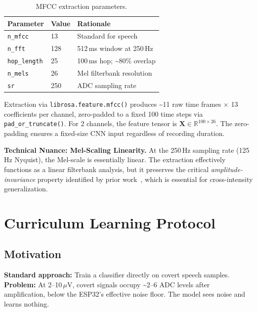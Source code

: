 \documentclass{article}
\begin{document}
\begin{table}[h]
\centering
\caption{MFCC extraction parameters.}
\label{tab:mfcc}
\begin{tabular}{@{}lll@{}}
\toprule
Parameter & Value & Rationale \\
\midrule
\texttt{n\_mfcc} & 13 & Standard for speech \\
\texttt{n\_fft} & 128 & 512\,ms window at 250\,Hz \\
\texttt{hop\_length} & 25 & 100\,ms hop; \textasciitilde80\% overlap \\
\texttt{n\_mels} & 26 & Mel filterbank resolution \\
\texttt{sr} & 250 & ADC sampling rate \\
\bottomrule
\end{tabular}
\end{table}

Extraction via \texttt{librosa.feature.mfcc()} produces \textasciitilde11 raw time frames $\times$ 13 coefficients per channel, zero-padded to a fixed 100 time steps via \texttt{pad\_or\_truncate()}. For 2 channels, the feature tensor is $\mathbf{X} \in \mathbb{R}^{100 \times 26}$. The zero-padding ensures a fixed-size CNN input regardless of recording duration.

\textbf{Technical Nuance: Mel-Scaling Linearity.} At the 250\,Hz sampling rate (125\,Hz Nyquist), the Mel-scale is essentially linear. The extraction effectively functions as a linear filterbank analysis, but it preserves the critical \emph{amplitude-invariance} property identified by prior work~\cite{kapur2018}, which is essential for cross-intensity generalization.

\section{Curriculum Learning Protocol}
\label{sec:curriculum}

\subsection{Motivation}

\textbf{Standard approach:} Train a classifier directly on covert speech samples.
\textbf{Problem:} At 2--10\,$\mu$V, covert signals occupy \textasciitilde2--6 ADC levels after amplification, below the ESP32's effective noise floor. The model sees noise and learns nothing.
\end{document}
